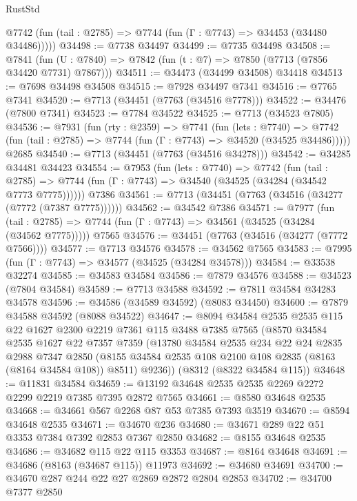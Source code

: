 \begin{lexlean}{RustStd}
\begin{coremodule}
      @7742 (fun (tail : @2785) => @7744 (fun (Γ : @7743) => @34453 (@34480 @34486)))))
@34498 := @7738 @34497
@34499 := @7735 @34498
@34508 := @7841
    (fun (U : @7840) => @7842 (fun (t : @7) => @7850 (@7713 (@7856 @34420 @7731) @7867)))
@34511 := @34473 (@34499 @34508) @34418
@34513 := @7698 @34498 @34508
@34515 := @7928 @34497 @7341
@34516 := @7765 @7341
@34520 := @7713 (@34451 (@7763 (@34516 @7778)))
@34522 := @34476 (@7800 @7341)
@34523 := @7784 @34522
@34525 := @7713 (@34523 @7805)
@34536 := @7931
    (fun (rty : @2359) =>
    @7741
      (fun (lets : @7740) =>
      @7742 (fun (tail : @2785) => @7744 (fun (Γ : @7743) => @34520 (@34525 @34486)))))
    @2685
@34540 := @7713 (@34451 (@7763 (@34516 @34278)))
@34542 := @34285 @34481 @34423
@34554 := @7953
    (fun (lets : @7740) =>
    @7742
      (fun (tail : @2785) =>
      @7744 (fun (Γ : @7743) => @34540 (@34525 (@34284 (@34542 @7773 @7775))))))
    @7386
@34561 := @7713 (@34451 (@7763 (@34516 (@34277 (@7772 (@7387 @7775))))))
@34562 := @34542 @7386
@34571 := @7977
    (fun (tail : @2785) => @7744 (fun (Γ : @7743) => @34561 (@34525 (@34284 (@34562 @7775)))))
    @7565
@34576 := @34451 (@7763 (@34516 (@34277 (@7772 @7566))))
@34577 := @7713 @34576
@34578 := @34562 @7565
@34583 := @7995 (fun (Γ : @7743) => @34577 (@34525 (@34284 @34578)))
@34584 := @33538 @32274
@34585 := @34583 @34584
@34586 := @7879 @34576
@34588 := @34523 (@7804 @34584)
@34589 := @7713 @34588
@34592 := @7811 @34584 @34283 @34578
@34596 := @34586 (@34589 @34592) (@8083 @34450)
@34600 := @7879 @34588 @34592 (@8088 @34522)
@34647 := @8094
    @34584
    @2535
    @2535
    @115
    @22
    @1627
    @2300
    @2219
    @7361
    @115
    @3488
    @7385
    @7565
    (@8570
      @34584
      @2535
      @1627
      @22
      @7357
      @7359
      (@13780
        @34584
        @2535
        @234
        @22
        @24
        @2835
        @2988
        @7347
        @2850
        (@8155 @34584 @2535 @108 @2100 @108 @2835 (@8163 (@8164 @34584 @108)) @8511)
        @9236))
    (@8312 (@8322 @34584 @115))
@34648 := @11831 @34584
@34659 := @13192 @34648 @2535 @2535 @2269 @2272 @2299 @2219 @7385 @7395 @2872 @7565
@34661 := @8580 @34648 @2535
@34668 := @34661 @567 @2268 @87 @53 @7385 @7393 @3519
@34670 := @8594 @34648 @2535
@34671 := @34670 @236
@34680 := @34671 @289 @22 @51 @3353 @7384 @7392 @2853 @7367 @2850
@34682 := @8155 @34648 @2535
@34686 := @34682 @115 @22 @115 @3353
@34687 := @8164 @34648
@34691 := @34686 (@8163 (@34687 @115)) @11973
@34692 := @34680 @34691
@34700 := @34670 @287 @244 @22 @27 @2869 @2872 @2804 @2853
@34702 := @34700 @7377 @2850

\end{coremodule}
\end{lexlean}
